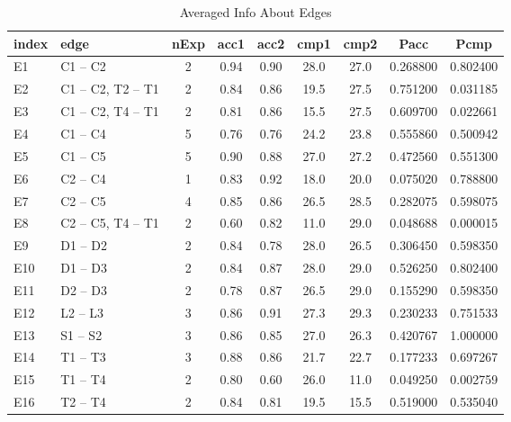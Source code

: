 \begin{table*}\begin{small}\begin{center}\caption{Averaged Info About Edges}\label{table:testedEdgesTable}\begin{tabular}
{llccccccc}
index & edge & nExp & acc1 & acc2 & cmp1 & cmp2 & Pacc & Pcmp \\
\toprule[0.16em]
E1 & C1 -- C2 & 2 & 0.94 & 0.90 & 28.0 & 27.0 & 0.268800 & 0.802400\\
E2 & C1 -- C2, T2  -- T1 & 2 & 0.84 & 0.86 & 19.5 & 27.5 & 0.751200 & 0.031185\\
E3 & C1 -- C2, T4 -- T1 & 2 & 0.81 & 0.86 & 15.5 & 27.5 & 0.609700 & 0.022661\\
E4 & C1 -- C4 & 5 & 0.76 & 0.76 & 24.2 & 23.8 & 0.555860 & 0.500942\\
E5 & C1 -- C5 & 5 & 0.90 & 0.88 & 27.0 & 27.2 & 0.472560 & 0.551300\\
E6 & C2 -- C4 & 1 & 0.83 & 0.92 & 18.0 & 20.0 & 0.075020 & 0.788800\\
E7 & C2 -- C5 & 4 & 0.85 & 0.86 & 26.5 & 28.5 & 0.282075 & 0.598075\\
E8 & C2 -- C5, T4 -- T1 & 2 & 0.60 & 0.82 & 11.0 & 29.0 & 0.048688 & 0.000015\\
E9 & D1 -- D2 & 2 & 0.84 & 0.78 & 28.0 & 26.5 & 0.306450 & 0.598350\\
E10 & D1 -- D3 & 2 & 0.84 & 0.87 & 28.0 & 29.0 & 0.526250 & 0.802400\\
E11 & D2 -- D3 & 2 & 0.78 & 0.87 & 26.5 & 29.0 & 0.155290 & 0.598350\\
E12 & L2 -- L3 & 3 & 0.86 & 0.91 & 27.3 & 29.3 & 0.230233 & 0.751533\\
E13 & S1 -- S2 & 3 & 0.86 & 0.85 & 27.0 & 26.3 & 0.420767 & 1.000000\\
E14 & T1 -- T3 & 3 & 0.88 & 0.86 & 21.7 & 22.7 & 0.177233 & 0.697267\\
E15 & T1 -- T4 & 2 & 0.80 & 0.60 & 26.0 & 11.0 & 0.049250 & 0.002759\\
E16 & T2 -- T4 & 2 & 0.84 & 0.81 & 19.5 & 15.5 & 0.519000 & 0.535040\\
\bottomrule[0.13em]\end{tabular}\end{center}\end{small}\end{table*}
